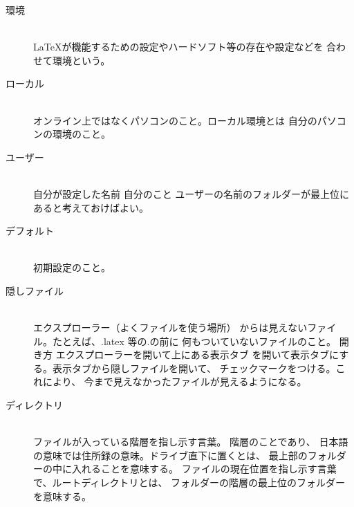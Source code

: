 \documentclass{ltjsarticle}
\begin{document}
\begin{description}
  \item [環境] ~\\
    \LaTeX が機能するための設定やハードソフト等の存在や設定などを
    合わせて環境という。
  \item [ローカル] ~\\
    オンライン上ではなくパソコンのこと。ローカル環境とは
    自分のパソコンの環境のこと。
  \item [ユーザー] ~\\
    自分が設定した名前 自分のこと
    ユーザーの名前のフォルダーが最上位にあると考えておけばよい。
  \item [デフォルト] ~\\
    初期設定のこと。
  \item [隠しファイル] ~\\
    エクスプローラー（よくファイルを使う場所）
    からは見えないファイル。たとえば、.latex 等の.の前に
    何もついていないファイルのこと。
    開き方 エクスプローラーを開いて上にある表示タブ
    を開いて表示タブにする。表示タブから隠しファイルを開いて、
    チェックマークをつける。これにより、
    今まで見えなかったファイルが見えるようになる。

  \item [ディレクトリ] ~\\
    ファイルが入っている階層を指し示す言葉。
    階層のことであり、
    日本語の意味では住所録の意味。ドライブ直下に置くとは、
    最上部のフォルダーの中に入れることを意味する。
    ファイルの現在位置を指し示す言葉で、ルートディレクトリとは、
    フォルダーの階層の最上位のフォルダーを意味する。



\end{description}
\end{document}

